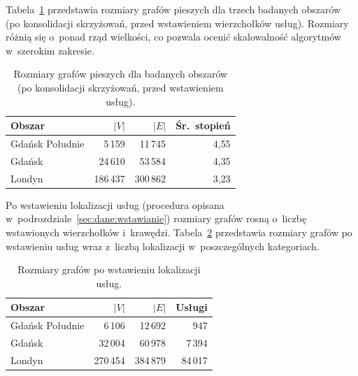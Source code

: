 Tabela~\ref{tab:grafy} przedstawia rozmiary grafów pieszych
dla trzech badanych obszarów (po konsolidacji skrzyżowań, przed wstawieniem wierzchołków usług).
Rozmiary różnią się o~ponad rząd wielkości,
co pozwala ocenić skalowalność algorytmów w~szerokim zakresie.

\begin{table}[ht]
\centering
\caption{Rozmiary grafów pieszych dla badanych obszarów
         (po konsolidacji skrzyżowań, przed wstawieniem usług).}
\label{tab:grafy}
\begin{tabular}{l r r r}
\hline
\textbf{Obszar} & $|V|$ & $|E|$ & \textbf{Śr.\ stopień} \\
\hline
Gdańsk Południe & 5\,159   & 11\,745  & 4{,}55 \\
Gdańsk          & 24\,610  & 53\,584  & 4{,}35 \\
Londyn          & 186\,437 & 300\,862 & 3{,}23 \\
\hline
\end{tabular}
\end{table}

Po wstawieniu lokalizacji usług (procedura opisana w~podrozdziale~\ref{sec:dane:wstawianie})
rozmiary grafów rosną o~liczbę wstawionych wierzchołków i~krawędzi.
Tabela~\ref{tab:grafy_po} przedstawia rozmiary grafów po wstawieniu usług
wraz z~liczbą lokalizacji w~poszczególnych kategoriach.

\begin{table}[ht]
\centering
\caption{Rozmiary grafów po wstawieniu lokalizacji usług.}
\label{tab:grafy_po}
\begin{tabular}{l r r r}
\hline
\textbf{Obszar} & $|V|$ & $|E|$ & \textbf{Usługi} \\
\hline
Gdańsk Południe & 6\,106   & 12\,692  & 947 \\
Gdańsk          & 32\,004  & 60\,978  & 7\,394 \\
Londyn          & 270\,454 & 384\,879 & 84\,017 \\
\hline
\end{tabular}
\end{table}


